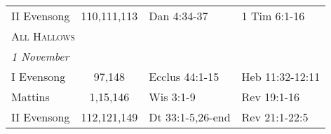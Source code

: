 \begin{longtable}{l c l l}
\hspace{1em} II Evensong&110,111,113&Dan 4:34-37&1 Tim 6:1-16\\
\multicolumn{4}{l}{\textsc{All Hallows}}\\
\multicolumn{4}{l}{\textit{1 November}}\\
\hspace{1em} I Evensong&97,148&Ecclus 44:1-15&Heb 11:32-12:11\\
\hspace{1em} Mattins&1,15,146&Wis 3:1-9&Rev 19:1-16\\
\hspace{1em} II Evensong&112,121,149&Dt 33:1-5,26-end&Rev 21:1-22:5\\
\end{longtable}
\clearpage
